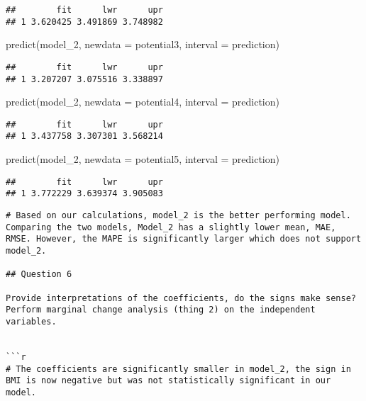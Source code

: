 \documentclass[
]{article}
\newenvironment{Shaded}{\begin{snugshade}}{\end{snugshade}}
\newcommand{\AttributeTok}[1]{\textcolor[rgb]{0.77,0.63,0.00}{#1}}
\newcommand{\FunctionTok}[1]{\textcolor[rgb]{0.00,0.00,0.00}{#1}}
\newcommand{\NormalTok}[1]{#1}
\newcommand{\StringTok}[1]{\textcolor[rgb]{0.31,0.60,0.02}{#1}}
\begin{document}
\begin{verbatim}
##        fit      lwr      upr
## 1 3.620425 3.491869 3.748982
\end{verbatim}

\begin{Shaded}
\begin{Highlighting}[]
\FunctionTok{predict}\NormalTok{(model\_2, }\AttributeTok{newdata =}\NormalTok{ potential3, }\AttributeTok{interval =} \StringTok{\textquotesingle{}prediction\textquotesingle{}}\NormalTok{)}
\end{Highlighting}
\end{Shaded}

\begin{verbatim}
##        fit      lwr      upr
## 1 3.207207 3.075516 3.338897
\end{verbatim}

\begin{Shaded}
\begin{Highlighting}[]
\FunctionTok{predict}\NormalTok{(model\_2, }\AttributeTok{newdata =}\NormalTok{ potential4, }\AttributeTok{interval =} \StringTok{\textquotesingle{}prediction\textquotesingle{}}\NormalTok{)}
\end{Highlighting}
\end{Shaded}

\begin{verbatim}
##        fit      lwr      upr
## 1 3.437758 3.307301 3.568214
\end{verbatim}

\begin{Shaded}
\begin{Highlighting}[]
\FunctionTok{predict}\NormalTok{(model\_2, }\AttributeTok{newdata =}\NormalTok{ potential5, }\AttributeTok{interval =} \StringTok{\textquotesingle{}prediction\textquotesingle{}}\NormalTok{)}
\end{Highlighting}
\end{Shaded}

\begin{verbatim}
##        fit      lwr      upr
## 1 3.772229 3.639374 3.905083
\end{verbatim}

\begin{verbatim}
# Based on our calculations, model_2 is the better performing model. Comparing the two models, Model_2 has a slightly lower mean, MAE, RMSE. However, the MAPE is significantly larger which does not support model_2.

## Question 6

Provide interpretations of the coefficients, do the signs make sense? Perform marginal change analysis (thing 2) on the independent variables.


```r
# The coefficients are significantly smaller in model_2, the sign in BMI is now negative but was not statistically significant in our model. 
\end{verbatim}
\end{document}
